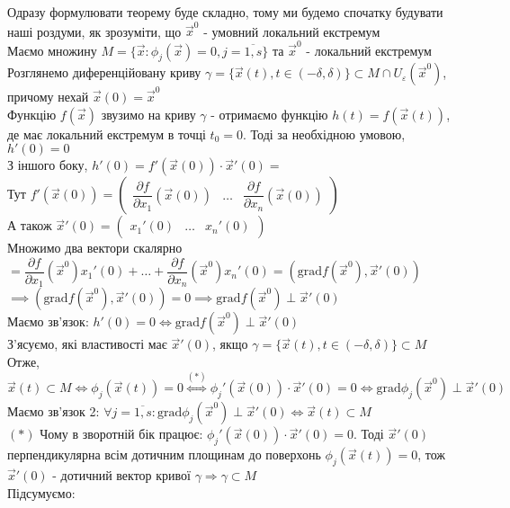 \documentclass[a4paper, 10pt]{article}
\def\departial#1#2{\dfrac{\partial {#1}}{\partial {#2}}}
\def\bigline{\vspace{5mm}\\}
\theoremstyle{theoremdd}
\theoremstyle{theoremdd}
\theoremstyle{theoremdd}
\theoremstyle{theoremdd}
\theoremstyle{theoremdd}
\theoremstyle{theoremdd}
\theoremstyle{theoremdd}
\theoremstyle{theoremdd}
\theoremstyle{theoremdd}
\begin{document}
Одразу формулювати теорему буде складно, тому ми будемо спочатку будувати наші роздуми, як зрозуміти, що $\vec{x}^0$ - умовний локальний екстремум
\bigline
Маємо множину $M=\{\vec{x}: \phi_j(\vec{x}) = 0, j=\overline{1,s} \}$ та $\vec{x}^0$ - локальний екстремум\\
Розглянемо диференційовану криву $\gamma = \{\vec{x}(t), t \in (-\delta, \delta )\} \subset M \cap U_{\varepsilon}(\vec{x}^0)$, причому нехай $\vec{x}(0) = \vec{x}^0$\\
Функцію $f(\vec{x})$ звузимо на криву $\gamma$ - отримаємо функцію $h(t) = f(\vec{x}(t))$, де має локальний екстремум в точці $t_0 = 0$. Тоді за необхідною умовою, $h'(0) = 0$\\
З іншого боку, $h'(0) = f'(\vec{x}(0)) \cdot \vec{x}'(0) \boxed{=}$\\
Тут $f'(\vec{x}(0)) = \begin{pmatrix}
\departial{f}{x_1}(\vec{x}(0)) & \dots & \departial{f}{x_n}(\vec{x}(0))
\end{pmatrix}$\\
А також $\vec{x}'(0) = \begin{pmatrix}
x_1'(0) & \dots & x_n'(0)
\end{pmatrix}$\\
Множимо два вектори скалярно\\
$\boxed{=} \departial{f}{x_1}(\vec{x}^0) x_1'(0) + \dots + \departial{f}{x_n}(\vec{x}^0) x_n'(0) = (\textrm{grad} f(\vec{x}^0), \vec{x}'(0))$\\
$\implies (\textrm{grad} f(\vec{x}^0), \vec{x}'(0)) = 0 \implies \textrm{grad} f(\vec{x}^0) \perp \vec{x}'(0)$\\
Маємо зв'язок: $h'(0) = 0 \iff \textrm{grad} f(\vec{x}^0) \perp \vec{x}'(0)$
\bigline
З'ясуємо, які властивості має $\vec{x}'(0)$, якщо $\gamma = \{\vec{x}(t), t \in (-\delta, \delta)\} \subset M$\\
Отже, $\vec{x}(t) \subset M \iff \phi_j(\vec{x}(t)) = 0 \overset{(*)}{\iff} \phi_j'(\vec{x}(0)) \cdot \vec{x}'(0) = 0 \iff  \textrm{grad} \phi_j(\vec{x}^0) \perp \vec{x}'(0)$\\
Маємо зв'язок 2: $\forall j=\overline{1,s}: \textrm{grad} \phi_j(\vec{x}^0) \perp \vec{x}'(0) \iff \vec{x}(t) \subset M$\\
$(*)$ Чому в зворотній бік працює: $\phi_j'(\vec{x}(0)) \cdot \vec{x}'(0) = 0$. Тоді $\vec{x}'(0)$ перпендикулярна всім дотичним площинам до поверхонь $\phi_j(\vec{x}(t)) = 0$, тож $\vec{x}'(0)$ - дотичний вектор кривої $\gamma \Rightarrow \gamma \subset M$
\bigline
Підсумуємо:\\
\end{document}
